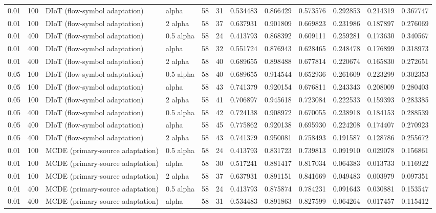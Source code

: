 \begin{tabular}{llllllllllll}
0.01 & 100 & DIoT (flow-symbol adaptation) & alpha & 58 & 31 & 0.534483 & 0.866429 & 0.573576 & 0.292853 & 0.214319 & 0.367747 \\
0.01 & 100 & DIoT (flow-symbol adaptation) & 2 alpha & 58 & 37 & 0.637931 & 0.901809 & 0.669823 & 0.231986 & 0.187897 & 0.276069 \\
0.01 & 400 & DIoT (flow-symbol adaptation) & 0.5 alpha & 58 & 24 & 0.413793 & 0.868392 & 0.609111 & 0.259281 & 0.173630 & 0.340567 \\
0.01 & 400 & DIoT (flow-symbol adaptation) & alpha & 58 & 32 & 0.551724 & 0.876943 & 0.628465 & 0.248478 & 0.176899 & 0.318973 \\
0.01 & 400 & DIoT (flow-symbol adaptation) & 2 alpha & 58 & 40 & 0.689655 & 0.898488 & 0.677814 & 0.220674 & 0.165830 & 0.272651 \\
0.05 & 100 & DIoT (flow-symbol adaptation) & 0.5 alpha & 58 & 40 & 0.689655 & 0.914544 & 0.652936 & 0.261609 & 0.223299 & 0.302353 \\
0.05 & 100 & DIoT (flow-symbol adaptation) & alpha & 58 & 43 & 0.741379 & 0.920154 & 0.676811 & 0.243343 & 0.208009 & 0.280403 \\
0.05 & 100 & DIoT (flow-symbol adaptation) & 2 alpha & 58 & 41 & 0.706897 & 0.945618 & 0.723084 & 0.222533 & 0.159393 & 0.283385 \\
0.05 & 400 & DIoT (flow-symbol adaptation) & 0.5 alpha & 58 & 42 & 0.724138 & 0.908972 & 0.670055 & 0.238918 & 0.184153 & 0.288539 \\
0.05 & 400 & DIoT (flow-symbol adaptation) & alpha & 58 & 45 & 0.775862 & 0.920138 & 0.695930 & 0.224208 & 0.174407 & 0.270923 \\
0.05 & 400 & DIoT (flow-symbol adaptation) & 2 alpha & 58 & 43 & 0.741379 & 0.950081 & 0.758493 & 0.191587 & 0.128786 & 0.255672 \\
0.01 & 100 & MCDE (primary-source adaptation) & 0.5 alpha & 58 & 24 & 0.413793 & 0.831723 & 0.739813 & 0.091910 & 0.029078 & 0.156861 \\
0.01 & 100 & MCDE (primary-source adaptation) & alpha & 58 & 30 & 0.517241 & 0.881417 & 0.817034 & 0.064383 & 0.013733 & 0.116922 \\
0.01 & 100 & MCDE (primary-source adaptation) & 2 alpha & 58 & 37 & 0.637931 & 0.891151 & 0.841669 & 0.049483 & 0.003979 & 0.097351 \\
0.01 & 400 & MCDE (primary-source adaptation) & 0.5 alpha & 58 & 24 & 0.413793 & 0.875874 & 0.784231 & 0.091643 & 0.030881 & 0.153547 \\
0.01 & 400 & MCDE (primary-source adaptation) & alpha & 58 & 31 & 0.534483 & 0.891863 & 0.827599 & 0.064264 & 0.017457 & 0.115412 \\

\end{tabular}

